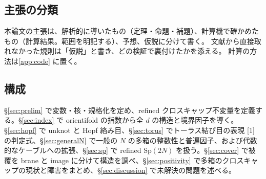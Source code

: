 \subsection{主張の分類}
本論文の主張は、解析的に導いたもの（定理・命題・補題）、計算機で確かめたもの（計算結果。範囲を明記する）、予想、仮説に分けて書く。
文献から直接取れなかった規則は「仮説」と書き、どの検証で裏付けたかを添える。
計算の方法は\ref{app:code} に置く。

\subsection{構成}
§\ref{sec:prelim} で変数・核・規格化を定め、refined クロスキャップ不変量を定義する。§\ref{sec:index} で orientifold の指数から全 $d$ の構造と境界因子を導く。§\ref{sec:hopf} で unknot と Hopf 絡み目、§\ref{sec:torus} でトーラス結び目の表現 [1] の判定式、§\ref{sec:generalN} で一般の $N$ の多箱の整数性と普遍因子、および代数的なケーブルへの拡張、§\ref{sec:sp} で refined Sp$(2N)$ を扱う。§\ref{sec:cover} で被覆を brane と image に分けて構造を調べ、§\ref{sec:positivity} で多箱のクロスキャップの現状と障害をまとめ、§\ref{sec:discussion} で未解決の問題を述べる。
